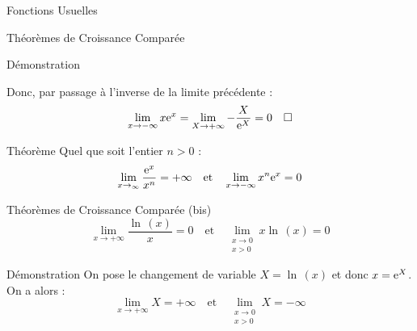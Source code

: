 \documentclass{cours}
\begin{document}
\begin{Gpartie}{Fonctions Usuelles}
\begin{Spartie}{Théorèmes de Croissance Comparée}
\begin{SSpartie}{Démonstration}
\begin{itemize}
                    Donc, par passage à l'inverse de la limite précédente : 
                    \[\lim\limits_{x\to-\infty}x\mathrm{e}^x=\lim\limits_{X\to+\infty}-\frac{X}{\mathrm{e}^X}=0\quad\square\]
                \end{itemize}
            \end{SSpartie}
        \end{Spartie}
        \pagebreak
        \begin{Spartie}{Théorème} 
            Quel que soit l'entier $n>0$ : \[\lim\limits_{x\to_\infty}\frac{\mathrm{e}^x}{x^n}=+\infty\quad\text{et}\quad\lim\limits_{x\to-\infty}x^n\mathrm{e}^x=0\]
        \end{Spartie}
        \begin{Spartie}{Théorèmes de Croissance Comparée (bis)} 
            \[\lim\limits_{x\to+\infty}\frac{\ln\,(x)}{x}=0\quad\text{et}\quad\lim\limits_{\substack{x\to0 \\ x>0}}x\ln\,(x)=0\]
            \begin{SSpartie}{Démonstration} 
                On pose le changement de variable $X=\ln\,(x)$ et donc $x=\mathrm{e}^X$. On a alors : \[\lim\limits_{x\to+\infty}X=+\infty\quad\text{et}\quad\lim\limits_{\substack{x\to0 \\ x>0}}X=-\infty\]
            \end{SSpartie}
        \end{Spartie}
    \end{Gpartie}
\end{document}
